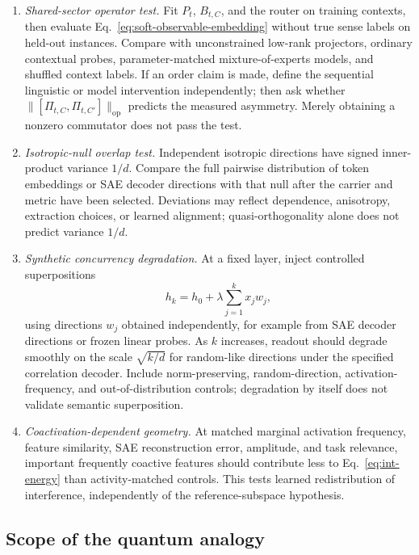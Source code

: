 \documentclass[
  aps,
  reprint,
  superscriptaddress,
  floatfix,
  nofootinbib,
  longbibliography
]{revtex4-2}
\newcommand{\opnorm}[1]{\lVert #1 \rVert_{\mathrm{op}}}
\begin{document}
\begin{enumerate}
\item \emph{Shared-sector operator test.}
Fit $P_t$, $B_{t,C}$, and the router on training contexts, then evaluate
Eq.~\eqref{eq:soft-observable-embedding} without true sense labels on held-out
instances. Compare with unconstrained low-rank projectors, ordinary contextual
probes, parameter-matched mixture-of-experts models, and shuffled context
labels.  If an order claim is made, define the sequential linguistic or model
intervention independently; then ask whether
$\opnorm{[\Pi_{t,C},\Pi_{t,C'}]}$ predicts the measured asymmetry.  Merely
obtaining a nonzero commutator does not pass the test.

\item \emph{Isotropic-null overlap test.}
Independent isotropic directions have signed inner-product variance $1/d$.
Compare the full pairwise distribution of token embeddings or SAE decoder
directions with that null after the carrier and metric have been selected.
Deviations may reflect dependence, anisotropy, extraction choices, or learned
alignment; quasi-orthogonality alone does not predict variance $1/d$.

\item \emph{Synthetic concurrency degradation.}
At a fixed layer, inject controlled superpositions
%
\begin{equation}
h_k=h_0+\lambda\sum_{j=1}^k x_j w_j,
\end{equation}
%
using directions $w_j$ obtained independently, for example from SAE
decoder directions or frozen linear probes. As $k$ increases, readout
should degrade smoothly on the scale $\sqrt{k/d}$ for random-like
directions under the specified correlation decoder.  Include norm-preserving,
random-direction, activation-frequency, and out-of-distribution controls;
degradation by itself does not validate semantic superposition.

\item \emph{Coactivation-dependent geometry.}
At matched marginal activation frequency, feature similarity, SAE
reconstruction error, amplitude, and task relevance, important frequently
coactive features should contribute less to Eq.~\eqref{eq:int-energy} than
activity-matched controls.  This tests learned redistribution of interference,
independently of the reference-subspace hypothesis.
\end{enumerate}

\subsection{Scope of the quantum analogy}
\label{sec:quantum}
\end{document}
